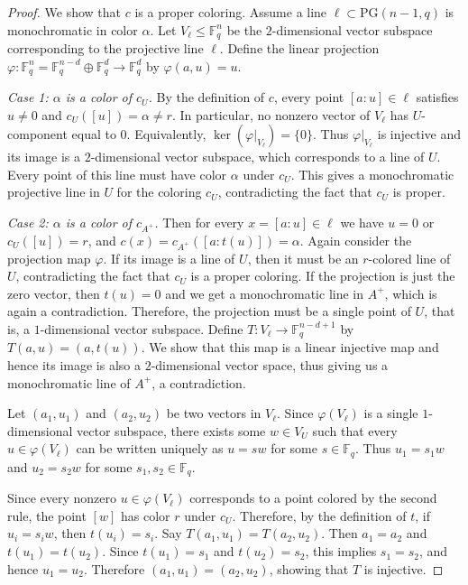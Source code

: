 \documentclass[10pt,a4paper]{amsart}
\newcommand{\PG}{\mathrm{PG}}
\begin{document}
\begin{proof}
We show that $c$ is a proper coloring.
Assume a line $\ell\subset\PG(n-1,q)$ is monochromatic in color $\alpha$.
Let $V_\ell\le \mathbb F_q^n$ be the $2$-dimensional vector subspace corresponding to the projective line $\ell$.
Define the linear projection $\varphi:\mathbb F_q^n=\mathbb F_q^{n-d}\oplus \mathbb F_q^d\longrightarrow \mathbb F_q^d$
by $\varphi(a,u)=u.$

\emph{Case 1: $\alpha$ is a color of $c_U$.}
By the definition of $c$, every point $[a:u]\in \ell$ satisfies $u\neq 0$ and $c_U([u])=\alpha\neq r.$
In particular, no nonzero vector of $V_\ell$ has $U$-component equal to $0$. Equivalently, $\ker(\varphi|_{V_\ell})=\{0\}.$
Thus $\varphi|_{V_\ell}$ is injective and its image is a $2$-dimensional vector subspace, which corresponds to a line of $U$. 
Every point of this line must have color $\alpha$ under $c_U$.
This gives a monochromatic projective line in $U$ for the coloring $c_U$, contradicting the fact that $c_U$ is proper.

\emph{Case 2: $\alpha$ is a color of $c_{A^+}$.}
Then for every $x=[a:u]\in\ell$ we have $u=0$ or $c_U([u])=r$, 
and 
$c(x)=c_{A^+}([a:t(u)])=\alpha$.
Again consider the projection map $\varphi$. 
If its image is a line of $U$, then it must be an $r$-colored line of $U$, contradicting the fact that $c_U$ is a proper coloring. 
If the projection is just the zero vector, then $t(u) = 0$ and we get a monochromatic line in $A^+$, which is again a contradiction. 
Therefore, the projection must be a single point of $U$, that is, a $1$-dimensional vector subspace.
Define $T: V_\ell \rightarrow \mathbb{F}_q^{n - d + 1}$ by $T(a, u) = (a, t(u))$.
We show that this map is a linear injective map and hence its image is also a $2$-dimensional vector space, thus giving us a monochromatic line of $A^+$, a contradiction.

Let $(a_1,u_1)$ and $(a_2,u_2)$ be two vectors in $V_\ell$. 
Since $\varphi(V_\ell)$ is a single $1$-dimensional vector subspace, there exists some $w\in V_U$ such that every $u\in \varphi(V_\ell)$ can be written uniquely as $u=sw$ for some $s\in\mathbb F_q$.
Thus $u_1=s_1w$ and $u_2=s_2w$ for some $s_1,s_2\in\mathbb F_q$.

Since every nonzero $u\in \varphi(V_\ell)$ corresponds to a point colored by the second rule, the point $[w]$ has color $r$ under $c_U$. Therefore, by the definition of $t$, if $u_i=s_iw$, then $t(u_i)=s_i$.
Say $T(a_1,u_1)=T(a_2,u_2)$. Then $a_1=a_2$ and $t(u_1)=t(u_2)$.
Since $t(u_1)=s_1$ and $t(u_2)=s_2$, this implies $s_1=s_2$, and hence $u_1=u_2$. Therefore $(a_1,u_1)=(a_2,u_2)$, showing that $T$ is injective.


\end{proof}
\end{document}
